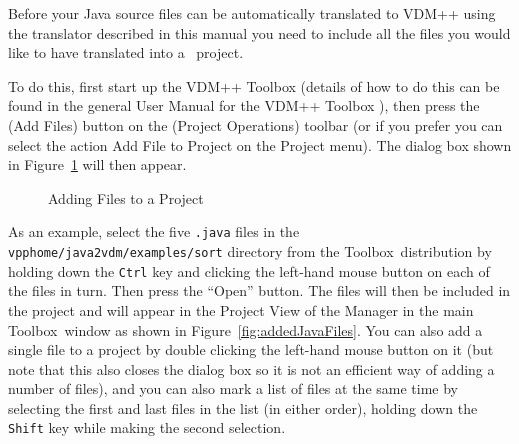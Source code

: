 \documentclass[\pformat,12pt]{article}
\newcommand{\ToolboxName}{VDM++ Toolbox}
\newcommand{\Toolbox}{Toolbox}
\newcommand{\vdmhome}{vpphome}
\newcommand{\cmd}{\tt }
\newcommand{\guicmd}[1]{{\sf #1}}
\begin{document}
Before your Java source files can be automatically translated to VDM++
using the translator described in this manual you need to include all
the files you would like to have translated into a \VDMTools\
project. 

To do this, first start up the \ToolboxName{} (details of how to do
this can be found in the general User Manual for the VDM++
Toolbox \cite{UserManPP-SCSK}), then press the 
(\guicmd{Add Files}) button on the (\guicmd{Project Operations})
toolbar (or if you prefer you can select the action \guicmd{Add File
  to Project} on the \guicmd{Project} menu). The dialog box shown
in Figure~\ref{fig:addJavaFiles} will then appear. 

\begin{figure}[tbh]
\begin{center}
\mbox{}
\caption{Adding Files to a Project\label{fig:addJavaFiles}}
\end{center}
\end{figure}

As an example, select the five {\tt .java} files in the 
{\tt \vdmhome/java2vdm/examples/sort} directory from the
\Toolbox\ distribution by holding down the {\cmd Ctrl} key and
clicking the left-hand mouse button on each of the 
files in turn. Then press the ``Open'' button. The files will then
be included in the project and will appear in the \guicmd{Project View}
of the \guicmd{Manager} in the main \Toolbox\ window as
shown in Figure~\ref{fig:addedJavaFiles}. You can also add a single
file to a project by double clicking the left-hand mouse button on it
(but note that this also closes the dialog box so it is not an
efficient way of adding a number of files), and you can also mark a
list of files at the same time by selecting the first and last files
in the list (in either order), holding down the {\cmd Shift} key while
making the second selection. 
\end{document}
